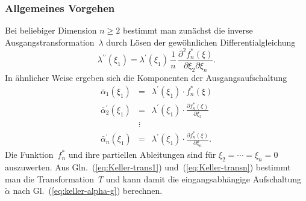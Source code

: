 \subsubsection*{Allgemeines Vorgehen}

Bei beliebiger Dimension $n\geq2$ bestimmt man zunächst die inverse
Ausgangstransformation~$\lambda$ durch Lösen der gewöhnlichen Differentialgleichung
\begin{equation}
\lambda^{\prime\prime}(\xi_{1})=\lambda^{\prime}(\xi_{1})\,\frac{1}{n}\,\frac{\partial^{2}f_{n}^{*}(\xi)}{\partial\xi_{2}\partial\xi_{n}}.\label{eq:keller-berechnung-inverse-ausgangstransformation}
\end{equation}
In ähnlicher Weise ergeben sich die Komponenten der Ausgangsaufschaltung
\begin{equation}
\begin{array}{lcl}
\bar{\alpha}_{1}(\xi_{1}) & = & \lambda^{\prime}(\xi_{1})\cdot f_{n}^{*}(\xi)\\
\bar{\alpha}_{2}^{\prime}(\xi_{1}) & = & \lambda^{\prime}(\xi_{1})\cdot\frac{\partial f_{n}^{*}(\xi)}{\partial\xi_{2}}\\
 & \vdots\\
\bar{\alpha}_{n}^{\prime}(\xi_{1}) & = & \lambda^{\prime}(\xi_{1})\cdot\frac{\partial f_{n}^{*}(\xi)}{\partial\xi_{n}}.
\end{array}\label{eq:Keller-berechnung-alpha}
\end{equation}
Die Funktion~$f_{n}^{*}$ und ihre partiellen Ableitungen sind für
$\xi_{2}=\cdots=\xi_{n}=0$ auszuwerten. Aus Gln.~(\ref{eq:Keller-trans1})
und~(\ref{eq:Keller-transn}) bestimmt man die Transformation~$T$
und kann damit die eingangsabhängige Aufschaltung~$\tilde{\alpha}$
nach Gl.~(\ref{eq:keller-alpha-g}) berechnen. 

